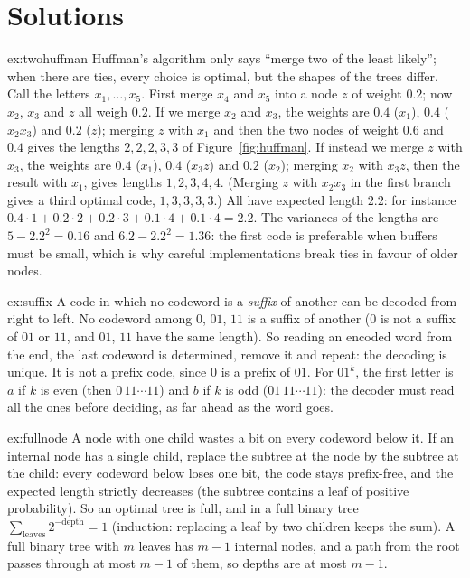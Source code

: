 \section{Solutions}

\begin{solution}{ex:twohuffman}
\idea Huffman's algorithm only says ``merge two of the least likely''; when there are ties, every choice is optimal, but the shapes of the trees differ.
\writeup Call the letters $x_1,\dots,x_5$. First merge $x_4$ and $x_5$ into a node $z$ of weight $0.2$; now $x_2$, $x_3$ and $z$ all weigh $0.2$. If we merge $x_2$ and $x_3$, the weights are $0.4$ ($x_1$), $0.4$ ($x_2x_3$) and $0.2$ ($z$); merging $z$ with $x_1$ and then the two nodes of weight $0.6$ and $0.4$ gives the lengths $2,2,2,3,3$ of Figure~\ref{fig:huffman}. If instead we merge $z$ with $x_3$, the weights are $0.4$ ($x_1$), $0.4$ ($x_3z$) and $0.2$ ($x_2$); merging $x_2$ with $x_3z$, then the result with $x_1$, gives lengths $1,2,3,4,4$. (Merging $z$ with $x_2x_3$ in the first branch gives a third optimal code, $1,3,3,3,3$.) All have expected length $2.2$: for instance $0.4\cdot1+0.2\cdot2+0.2\cdot3+0.1\cdot4+0.1\cdot4=2.2$. The variances of the lengths are $5-2.2^2=0.16$ and $6.2-2.2^2=1.36$: the first code is preferable when buffers must be small, which is why careful implementations break ties in favour of older nodes.
\end{solution}

\begin{solution}{ex:suffix}
\idea A code in which no codeword is a \emph{suffix} of another can be decoded from right to left.
\writeup No codeword among $0$, $01$, $11$ is a suffix of another ($0$ is not a suffix of $01$ or $11$, and $01$, $11$ have the same length). So reading an encoded word from the end, the last codeword is determined, remove it and repeat: the decoding is unique. It is not a prefix code, since $0$ is a prefix of $01$. For $01^k$, the first letter is $a$ if $k$ is even (then $0\,11\cdots11$) and $b$ if $k$ is odd ($01\,11\cdots11$): the decoder must read all the ones before deciding, as far ahead as the word goes.
\end{solution}

\begin{solution}{ex:fullnode}
\idea A node with one child wastes a bit on every codeword below it.
\writeup If an internal node has a single child, replace the subtree at the node by the subtree at the child: every codeword below loses one bit, the code stays prefix-free, and the expected length strictly decreases (the subtree contains a leaf of positive probability). So an optimal tree is full, and in a full binary tree $\sum_{\text{leaves}}2^{-\text{depth}}=1$ (induction: replacing a leaf by two children keeps the sum). A full binary tree with $m$ leaves has $m-1$ internal nodes, and a path from the root passes through at most $m-1$ of them, so depths are at most $m-1$.
\end{solution}

